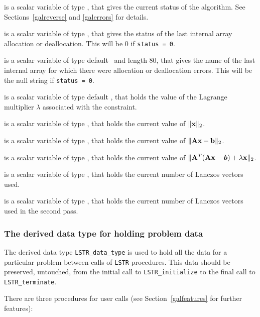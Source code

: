 \documentclass{galahad}
\newcommand{\packagename}{LS\-TR}
\begin{document}
\begin{description}
 is a scalar variable of type \integer, that gives the
current status of the algorithm. See Sections~\ref{galreverse} and
\ref{galerrors} for details.

 is a scalar variable of type \integer,
that gives the status of the last internal array allocation
or deallocation. This will be 0 if {\tt status = 0}.

 is a scalar variable of type default \character\
and length 80, that  gives the name of the last internal array
for which there were allocation or deallocation errors.
This will be the null string if {\tt status = 0}.

 is a scalar variable of type default
\realdp, that holds the
value of the Lagrange multiplier $\lambda$ associated with the constraint.

 is a scalar variable of type \realdp,
that holds the current value of $\|{\mathbf{x}}\|_2$.

 is a scalar variable of type \realdp,
that holds the current value of $\|{\mathbf{A}}{\mathbf{x}}-{\mathbf{b}}\|_2$.

 is a scalar variable of type \realdp,
that holds the current value of
$\|{\mathbf{A}}^T ( {\mathbf{A}} {\mathbf{x}} - \bm b ) + \lambda {\mathbf{x}} \|_2$.

 is a scalar variable of type \integer, that holds the
current number of Lanczos vectors used.

 is a scalar variable of type \integer, that holds the
current number of Lanczos vectors used in the second pass.

\end{description}


\subsubsection{The derived data type for holding problem data}\label{typedata}
The derived data type
{\tt \packagename\_data\_type}
is used to hold all the data for a particular problem between calls of
{\tt \packagename} procedures.
This data should be preserved, untouched, from the initial call to
{\tt \packagename\_initialize}
to the final call to
{\tt \packagename\_terminate}.


\galarguments
There are three procedures for user calls
(see Section~\ref{galfeatures} for further features):
\end{document}
